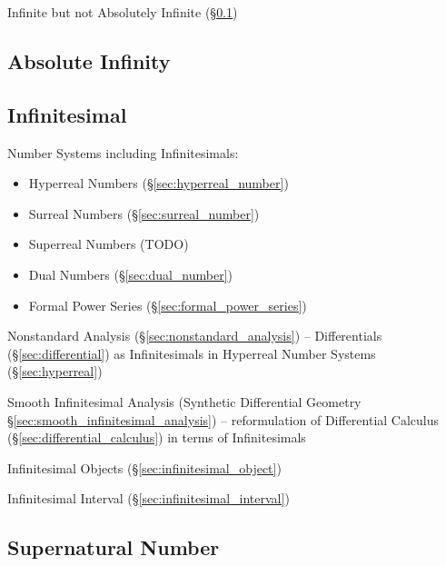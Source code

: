 Infinite but not Absolutely Infinite (\S\ref{sec:absolute_infinity})



\subsection{Absolute Infinity}\label{sec:absolute_infinity}

\subsection{Infinitesimal}\label{sec:infinitesimal}

Number Systems including Infinitesimals:
\begin{itemize}
  \item Hyperreal Numbers (\S\ref{sec:hyperreal_number})
  \item Surreal Numbers (\S\ref{sec:surreal_number})
  \item Superreal Numbers (TODO)
  \item Dual Numbers (\S\ref{sec:dual_number})
  \item Formal Power Series (\S\ref{sec:formal_power_series})
\end{itemize}

\fist Nonstandard Analysis (\S\ref{sec:nonstandard_analysis}) -- Differentials
(\S\ref{sec:differential}) as Infinitesimals in
Hyperreal Number Systems (\S\ref{sec:hyperreal})

\fist Smooth Infinitesimal Analysis (Synthetic Differential Geometry
\S\ref{sec:smooth_infinitesimal_analysis}) -- reformulation of Differential
Calculus (\S\ref{sec:differential_calculus}) in terms of Infinitesimals

\fist Infinitesimal Objects (\S\ref{sec:infinitesimal_object})

\fist Infinitesimal Interval (\S\ref{sec:infinitesimal_interval})



\subsection{Supernatural Number}\label{sec:supernatural_number}

